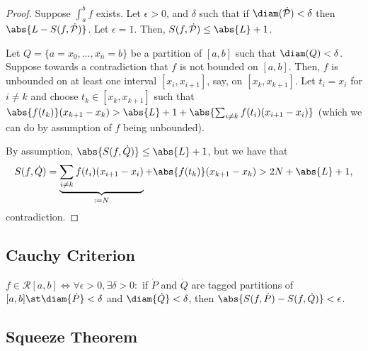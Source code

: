\begin{proof}
    Suppose $\int_a^b f$ exists. Let $\epsilon > 0$, and $\delta$ such that if $\diam (\dot{\mathcal{P}}) < \delta$ then $\abs{L - S(f, \dot{\mathcal{P}})}$. Let $\epsilon = 1$. Then, $S(f, \dot{\mathcal{P}}) \leq \abs{L} + 1$.

    Let $Q = \{a = x_0, \dots, x_n = b\}$ be a partition of $[a, b]$ such that $\diam (Q) < \delta$. Suppose towards a contradiction that $f$ is not bounded on $[a, b]$. Then, $f$ is unbounded on at least one interval $[x_i, x_{i+1}]$, say, on $[x_k, x_{k+1}]$. Let $t_i = x_i$ for $i \neq k$ and choose $t_k \in [x_k, x_{k+1}]$ such that $\abs{f(t_k)}(x_{k+1} - x_k) > \abs{L} + 1 + \abs{\sum_{i \neq k} f(t_i)(x_{i+1} - x_i)}$ (which we can do by assumption of $f$ being unbounded).

    By assumption, $\abs{S(f, \dot{Q})} \leq \abs{L} + 1$, but we have that \begin{align*}
        S(f, \dot{Q}) = \underbrace{\sum_{i \neq k} f(t_i)(x_{i+1} - x_{i})}_{:=N} + \abs{f(t_k)}(x_{k+1}-x_k) > 2N + \abs{L} + 1,
    \end{align*}
    contradiction.
\end{proof}

\subsection{Cauchy Criterion}

\begin{proposition}
    $f \in \mathcal{R}[a, b] \iff \forall \epsilon > 0, \exists \delta > 0 : $ if $\dot{P}$ and $\dot{Q}$ are tagged partitions of $[a, b] \st \diam{\dot{P}} < \delta$ and $\diam{\dot{Q}} < \delta$, then $\abs{S(f, \dot{P}) - S(f, \dot{Q})} < \epsilon$.\footnotemark
\end{proposition}

\subsection{Squeeze Theorem}

